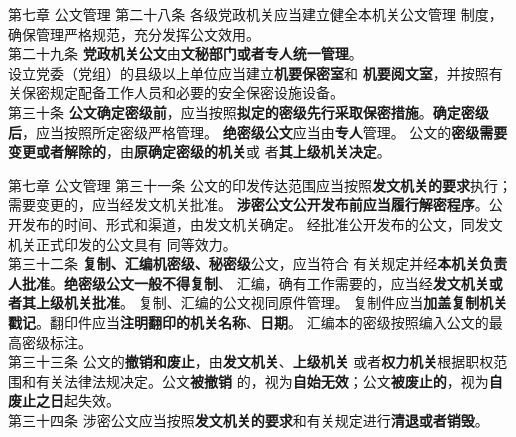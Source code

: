 \documentclass[aspectratio=169]{beamer}
\begin{document}
\begin{frame}[t]{第七章 公文管理} \vspace{20pt}
    第二十八条 各级党政机关应当建立健全本机关公文管理
    制度，确保管理严格规范，充分发挥公文效用。\\
    第二十九条 \textbf{党政机关公文}由\textbf{文秘部门或者专人}\textbf{统一管理}。\\
    设立党委（党组）的县级以上单位应当建立\textbf{机要保密室}和
    \textbf{机要阅文室}，并按照有关保密规定配备工作人员和必要的安全保密设施设备。\\
    第三十条 \textbf{公文确定密级前}，应当按照\textbf{拟定的密级先行采取保密措施}。\textbf{确定密级后}，应当按照所定密级严格管理。
    \textbf{绝密级公文}应当由\textbf{专人}管理。
    公文的\textbf{密级需要变更或者解除的}，由\textbf{原确定密级的机关}或
    者\textbf{其上级机关决定}。\\
\end{frame}



\begin{frame}[t]{第七章 公文管理} \vspace{20pt}
    第三十一条 公文的印发传达范围应当按照\textbf{发文机关的要求}执行；
    需要变更的，应当经发文机关批准。
    \textbf{涉密公文公开发布前应当履行解密程序}。公开发布的时间、形式和渠道，由发文机关确定。
    经批准公开发布的公文，同发文机关正式印发的公文具有
    同等效力。\\
    第三十二条 \textbf{复制、汇编机密级、秘密级}公文，应当符合
    有关规定并经\textbf{本机关负责人批准}。\textbf{绝密级公文一般不得复制}、
    汇编，确有工作需要的，应当经\textbf{发文机关或者其上级机关批准}。
    复制、汇编的公文视同原件管理。
    复制件应当\textbf{加盖复制机关戳记}。翻印件应当\textbf{注明翻印的机关名称}、\textbf{日期}。
    汇编本的密级按照编入公文的最高密级标注。\\
    第三十三条 公文的\textbf{撤销和废止}，由\textbf{发文机关}、\textbf{上级机关}
    或者\textbf{权力机关}根据职权范围和有关法律法规决定。公文\textbf{被撤销}
    的，视为\textbf{自始无效}；公文\textbf{被废止的}，视为\textbf{自废止之日}起失效。\\
    第三十四条 涉密公文应当按照\textbf{发文机关的要求}和有关规定进行\textbf{清退或者销毁}。
\end{frame}
\end{document}
